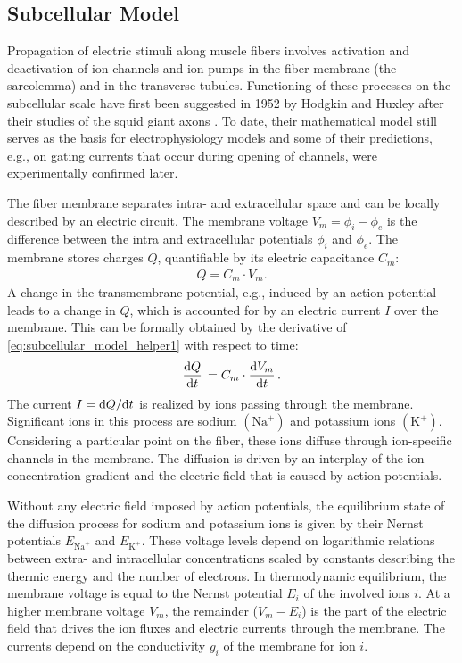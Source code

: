 \subsection{Subcellular Model}\label{sec:subcelullar_model}

Propagation of electric stimuli along muscle fibers involves activation and deactivation of ion channels and ion pumps in the fiber membrane  (the sarcolemma) and in the transverse tubules.
Functioning of these processes on the subcellular scale have first been suggested in 1952 by Hodgkin and Huxley after their studies of the squid giant axons \cite{Hodgkin1952,hodgkin1952propagation}. To date, their mathematical model still serves as the basis for electrophysiology models and some of their predictions, e.g., on gating currents that occur during opening of channels, were experimentally confirmed later.

The fiber membrane separates intra- and extracellular space and can be locally described by an electric circuit. The membrane voltage $V_m=\phi_i-\phi_e$ is the difference between the intra and extracellular potentials $\phi_i$ and $\phi_e$. The membrane stores charges $Q$, quantifiable by its electric capacitance $C_m$:
\begin{align}\label{eq:subcellular_model_helper1}
  Q = C_m\cdot V_m.  
\end{align}
%
A change in the transmembrane potential, e.g., induced by an action potential leads to a change in $Q$, which is accounted for by an electric current $I$ over the membrane. This can be formally obtained by the derivative of \cref{eq:subcellular_model_helper1} with respect to time:%
\begin{align}\label{eq:subcellular_model_helper2}
  \d{Q}{t} = C_m \cdot \d{V_m}{t}.
\end{align}
%
The current $I=\d Q / \d t$ is realized by ions passing through the membrane.
Significant ions in this process are sodium $(\text{Na}^{+})$ and potassium ions $(\text{K}^{+})$.
Considering a particular point on the fiber, these ions diffuse through ion-specific channels in the membrane.
The diffusion is driven by an interplay of the ion concentration gradient and the electric field that is caused by action potentials.

Without any electric field imposed by action potentials, the equilibrium state of the diffusion process for sodium and potassium ions is given by their Nernst potentials $E_{\text{Na}^{+}}$ and $E_{\text{K}^{+}}$. These voltage levels depend on logarithmic relations between extra- and intracellular concentrations scaled by constants describing the thermic energy and the number of electrons.
In thermodynamic equilibrium, the membrane voltage is equal to the Nernst potential $E_i$ of the involved ions $i$. 
At a higher membrane voltage $V_m$, the remainder ($V_m - E_i$) is the part of the electric field that drives the
ion fluxes and electric currents through the membrane. The currents depend on the conductivity $g_i$ of
the membrane for ion $i$. 


